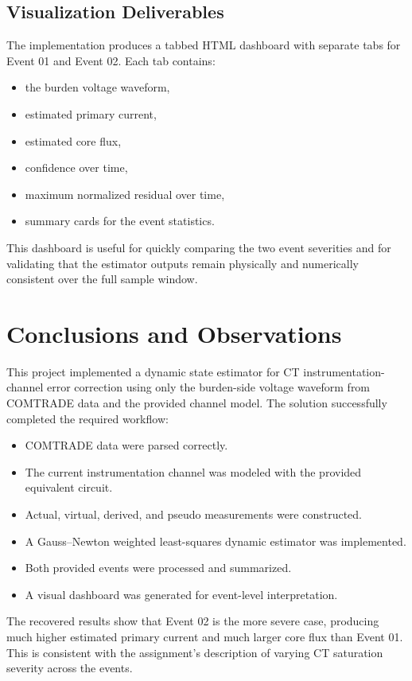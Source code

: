 \documentclass[11pt]{article}
\begin{document}
\subsection{Visualization Deliverables}
The implementation produces a tabbed HTML dashboard with separate tabs for Event 01 and Event 02.
Each tab contains:
\begin{itemize}
  \item the burden voltage waveform,
  \item estimated primary current,
  \item estimated core flux,
  \item confidence over time,
  \item maximum normalized residual over time,
  \item summary cards for the event statistics.
\end{itemize}

This dashboard is useful for quickly comparing the two event severities and for validating that the
estimator outputs remain physically and numerically consistent over the full sample window.

\section{Conclusions and Observations}
This project implemented a dynamic state estimator for CT instrumentation-channel error correction
using only the burden-side voltage waveform from COMTRADE data and the provided channel model. The
solution successfully completed the required workflow:
\begin{itemize}
  \item COMTRADE data were parsed correctly.
  \item The current instrumentation channel was modeled with the provided equivalent circuit.
  \item Actual, virtual, derived, and pseudo measurements were constructed.
  \item A Gauss--Newton weighted least-squares dynamic estimator was implemented.
  \item Both provided events were processed and summarized.
  \item A visual dashboard was generated for event-level interpretation.
\end{itemize}

The recovered results show that Event 02 is the more severe case, producing much higher estimated
primary current and much larger core flux than Event 01. This is consistent with the assignment's
description of varying CT saturation severity across the events.
\end{document}
